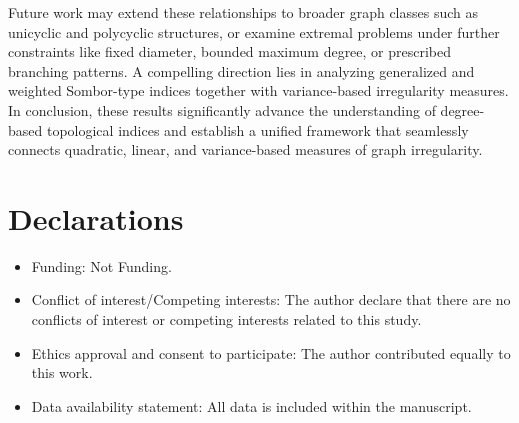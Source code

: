 \documentclass[12pt, a4paper]{article}
\begin{document}
Future work may extend these relationships to broader graph classes such as unicyclic and polycyclic structures, or examine extremal problems under further constraints like fixed diameter, bounded maximum degree, or prescribed branching patterns. A compelling direction lies in analyzing generalized and weighted Sombor-type indices together with variance-based irregularity measures.  In conclusion, these results significantly advance the understanding of degree-based topological indices and establish a unified framework that seamlessly connects quadratic, linear, and variance-based measures of graph irregularity.



\section*{Declarations}
\begin{itemize}
	\item Funding: Not Funding.
	\item Conflict of interest/Competing interests: The author declare that there are no conflicts of interest or competing interests related to this study.
	\item Ethics approval and consent to participate: The author contributed equally to this work.
	\item Data availability statement: All data is included within the manuscript.
\end{itemize}
\end{document}

